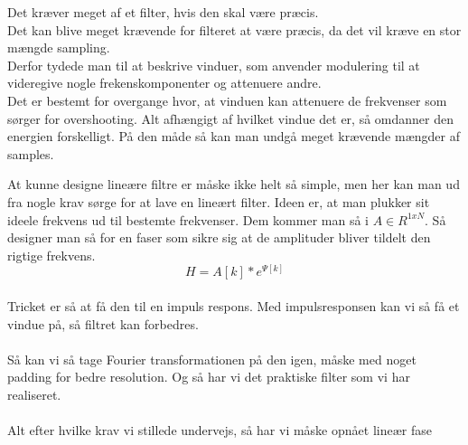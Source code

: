 \begin{Motivationer}
    \begin{Motivation}[Vinduer]
        Det kræver meget af et filter, hvis den skal være præcis.\\
        Det kan blive meget krævende for filteret at være præcis, da det vil kræve en stor mængde sampling.\\
        Derfor tydede man til at beskrive vinduer, som anvender modulering til at videregive nogle frekenskomponenter og attenuere andre. \\
        Det er bestemt for overgange hvor, at vinduen kan attenuere de frekvenser som sørger for overshooting. 
        Alt afhængigt af hvilket vindue det er, så omdanner den energien forskelligt. 
        På den måde så kan man undgå meget krævende mængder af samples. 
    \end{Motivation}

    \begin{Motivation}
        At kunne designe lineære filtre er måske ikke helt så simple, men her kan man ud fra nogle krav sørge for at lave en lineært filter.
        Ideen er, at man plukker sit ideele frekvens ud til bestemte frekvenser. Dem kommer man så i $A \in R^{1xN}$.
        Så designer man så for en faser som sikre sig at de amplituder bliver tildelt den rigtige frekvens. 
        \[H = A[k] * e^{\Psi[k]}\]\\

        Tricket er så at få den til en impuls respons. 
        Med impulsresponsen kan vi så få et vindue på, så filtret kan forbedres. \\\\
        
        Så kan vi så tage Fourier transformationen på den igen, måske med noget padding for bedre resolution. 
        Og så har vi det praktiske filter som vi har realiseret. \\\\

        Alt efter hvilke krav vi stillede undervejs, så har vi måske opnået lineær fase
        

\end{Motivation}
\end{Motivationer}
